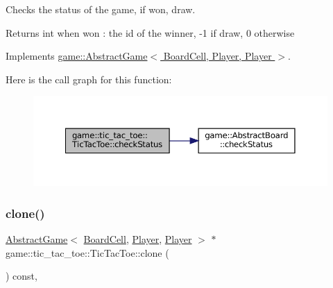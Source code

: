 Checks the status of the game, if won, draw. 

\begin{DoxyReturn}{Returns}
int when won \+: the id of the winner, -\/1 if draw, 0 otherwise 
\end{DoxyReturn}


Implements \hyperlink{classgame_1_1_abstract_game_a3683d4f37908f769a470af6ebf73d849}{game\+::\+Abstract\+Game$<$ Board\+Cell, Player, Player $>$}.

Here is the call graph for this function\+:
\nopagebreak
\begin{figure}[H]
\begin{center}
\leavevmode
\includegraphics[width=350pt]{classgame_1_1tic__tac__toe_1_1_tic_tac_toe_a033d73237ae31a39c23a0e887adbce2f_cgraph}
\end{center}
\end{figure}
\mbox{\label{classgame_1_1tic__tac__toe_1_1_tic_tac_toe_a11f31f44ee9ebe8c394bcc9f2a74fab4}} 
\subsubsection{\texorpdfstring{clone()}{clone()}}
{\footnotesize\ttfamily \hyperlink{classgame_1_1_abstract_game}{Abstract\+Game}$<$ \hyperlink{classgame_1_1tic__tac__toe_1_1_board_cell}{Board\+Cell}, \hyperlink{classgame_1_1tic__tac__toe_1_1_player}{Player}, \hyperlink{classgame_1_1tic__tac__toe_1_1_player}{Player} $>$ $\ast$ game\+::tic\+\_\+tac\+\_\+toe\+::\+Tic\+Tac\+Toe\+::clone (\begin{DoxyParamCaption}{ }\end{DoxyParamCaption}) const\hspace{0.3cm}{\ttfamily [override]}, {\ttfamily [virtual]}}



